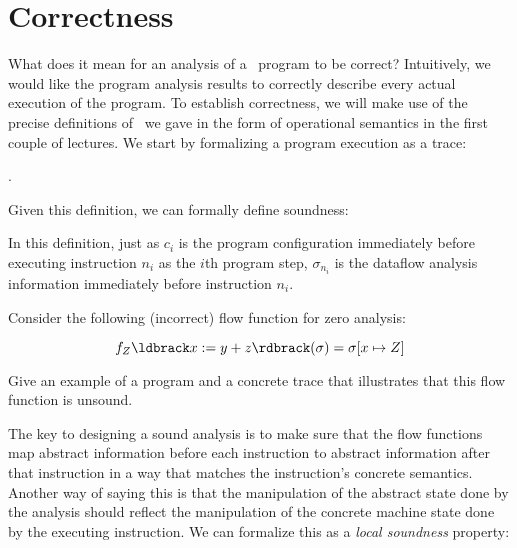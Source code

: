 \documentclass[11pt]{article}
\begin{document}
\section{Correctness}

What does it mean for an analysis of a \WhileThAddr\ program to be correct?  Intuitively, we would like the program analysis results to correctly describe every actual execution of the program.  To establish correctness, we will make use of the precise definitions of \WhileThAddr\ we gave in the form of operational semantics in the first couple of lectures. 
We start by formalizing a program execution as a trace:

.


\noindent Given this definition, we can formally define soundness:


In this definition, just as $c_i$ is the program configuration immediately before executing instruction $n_i$ as the $i$th program step, $\sigma_{n_i}$ is the dataflow analysis information immediately before instruction $n_i$.




  Consider the following (incorrect) flow function for zero analysis:

\[
f_Z\parg{x := y + z}(\sigma) = \sigma[x \mapsto Z]
\]

Give an example of a program and a concrete trace that illustrates that this flow function is unsound.



The key to designing a sound analysis is to make sure that the flow functions map abstract information before each instruction to abstract information after that instruction in a way that matches the instruction's concrete semantics.  Another way of saying this is that the manipulation of the abstract state done by the analysis should reflect the  manipulation of the concrete machine state done by the executing instruction.  We can formalize this as a \textit{local soundness} property:
\end{document}
